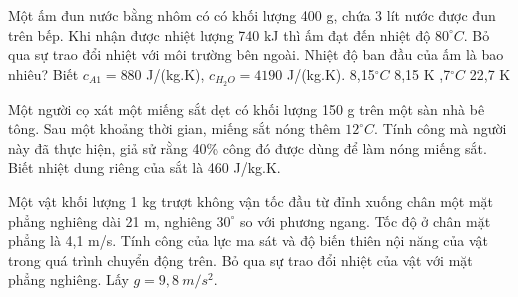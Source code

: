 \begin{vidu}%
	Một ấm đun nước bằng nhôm có có khối lượng 400 g, chứa 3 lít nước được đun trên bếp. Khi nhận được nhiệt lượng 740 kJ thì ấm đạt đến nhiệt độ $80^{\circ}C$.  Bỏ qua sự trao đổi nhiệt với môi trường bên ngoài. Nhiệt độ ban đầu của ấm là bao nhiêu? Biết $c_{A1}=880$ J/(kg.K), $c_{H_2O}=4190$ J/(kg.K).
	\choice
	{8,15$^{\circ}C$}
	{8,15 K}
	{,7$^{\circ}C$}
	{22,7 K}
\end{vidu}
\begin{vidu}
	Một người cọ xát một miếng sắt dẹt có khối lượng 150 g trên một sàn nhà bê tông. Sau một khoảng thời gian, miếng sắt nóng thêm $12^\circ C$. Tính công mà người này đã thực hiện, giả sử rằng 40\% công đó được dùng để làm nóng miếng sắt. Biết nhiệt dung riêng của sắt là 460 J/kg.K.
	\loigiai{
		\begin{itemize}
			\item 
			\item 
			\item 
			\item 
			\item 
			\item 
		\end{itemize}
	}
\end{vidu}
\begin{vidu}
	Một vật khối lượng 1 kg trượt không vận tốc đầu từ đỉnh xuống chân một mặt phẳng nghiêng dài 21 m, nghiêng $30^\circ$ so với phương ngang. Tốc độ ở chân mặt phẳng là 4,1 m/s. Tính công của lực ma sát và độ biến thiên nội năng của vật trong quá trình chuyển động trên. Bỏ qua sự trao đổi nhiệt của vật với mặt phẳng nghiêng. Lấy $g=9,8\ m/s^2$.
	\loigiai{
		\begin{itemize}
			\item 
			\item 
			\item 
			\item 
			\item 
			\item 
		\end{itemize}
	}
\end{vidu}


